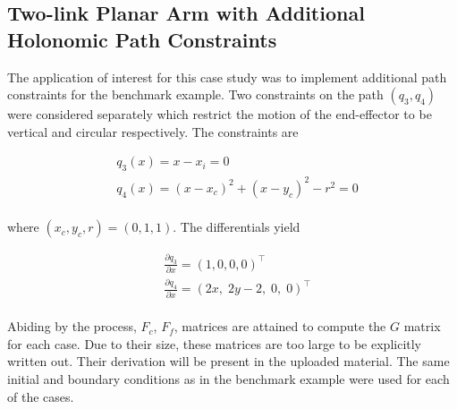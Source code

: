 \documentclass[letterpaper, 10 pt, conference]{ieeeconf}
\begin{document}
\newpage

\subsection{Two-link Planar Arm with Additional Holonomic Path Constraints}

The application of interest for this case study was to implement additional path constraints
for the benchmark example. Two constraints on the path $(q_3,q_4)$ were considered separately which restrict the motion of the end-effector to be vertical and circular respectively. The constraints are

\begin{equation}
\begin{aligned}
&q_{3}(x)= x - x_i = 0 \\
&q_{4}(x)= (x - x_c)^2 + (x - y_c)^2 - r^2 = 0
\end{aligned}
\end{equation}
\\

where $(x_c, y_c, r) =  (0, 1, 1)$. The differentials yield

\begin{equation}
\begin{aligned}
&\frac{\partial q_{3}}{\partial x}=\left(1, 0, 0, 0\right)^{\top} \\ 
&\frac{\partial q_{4}}{\partial x}=\left(2x, \; 2y - 2, \; 0, \; 0\right)^{\top}
\end{aligned}
\end{equation}
\\

Abiding by the process, $F_c$, $F_f$, matrices are attained to compute the $G$ matrix for each case. Due to their size, these matrices are too large to be explicitly written out. Their derivation will be present in the uploaded material. The same initial and boundary conditions as in the benchmark example were used for each of the cases.
\end{document}
